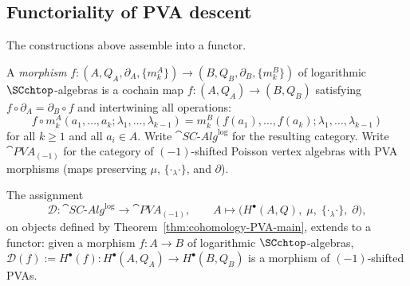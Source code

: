 \subsection{Functoriality of PVA descent}
\label{subsec:pva-functoriality}

The constructions above assemble into a functor.

\begin{definition}
\label{def:morphism-SC-algebra}
A \emph{morphism} $f \colon (A, Q_A, \partial_A, \{m_k^A\})
\to (B, Q_B, \partial_B, \{m_k^B\})$ of logarithmic
$\SCchtop$-algebras is a cochain map
$f \colon (A, Q_A) \to (B, Q_B)$
satisfying $f \circ \partial_A = \partial_B \circ f$ and
intertwining all operations:
\[
 f \circ m_k^A(a_1, \ldots, a_k; \lambda_1, \ldots, \lambda_{k-1})
 = m_k^B(f(a_1), \ldots, f(a_k); \lambda_1, \ldots, \lambda_{k-1})
\]
for all $k \geq 1$ and all $a_i \in A$.
Write $\cat{SC\text{-}Alg}^{\log}$ for the resulting category.
Write $\cat{PVA}_{(-1)}$ for the category of
$(-1)$-shifted Poisson vertex algebras with PVA morphisms
(maps preserving $\mu$, $\{\cdot{}_\lambda\cdot\}$, and $\partial$).
\end{definition}

\begin{theorem}
\label{thm:pva-descent-functor}
The assignment
\[
 \mathcal{D} \colon \cat{SC\text{-}Alg}^{\log}
 \longrightarrow \cat{PVA}_{(-1)},
 \qquad
 A \longmapsto \bigl(H^\bullet(A,Q),\; \mu,\;
 \{\cdot{}_\lambda\cdot\},\; \partial\bigr),
\]
on objects defined by Theorem~\textup{\ref{thm:cohomology-PVA-main}},
extends to a functor: given a morphism
$f \colon A \to B$ of logarithmic $\SCchtop$-algebras,
$\mathcal{D}(f) := H^\bullet(f) \colon H^\bullet(A,Q_A) \to
H^\bullet(B,Q_B)$ is a morphism of $(-1)$-shifted PVAs.
\end{theorem}

